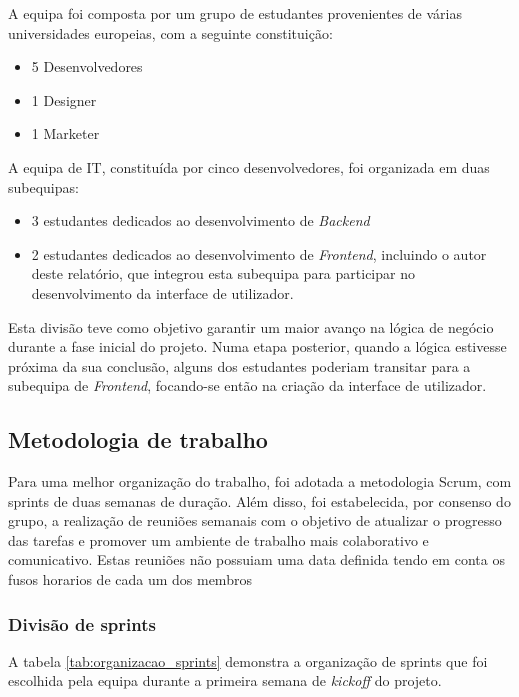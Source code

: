 A equipa foi composta por um grupo de estudantes provenientes de várias universidades europeias, com a seguinte constituição:

\begin{itemize}
    \item 5 Desenvolvedores
    \item 1 Designer
    \item 1 Marketer
\end{itemize}

A equipa de IT, constituída por cinco desenvolvedores, foi organizada em duas subequipas: 
\begin{itemize}
    \item 3 estudantes dedicados ao desenvolvimento de \textit{Backend}
    \item 2 estudantes dedicados ao desenvolvimento de \textit{Frontend}, incluindo o autor deste relatório, que integrou esta subequipa para participar no desenvolvimento da interface de utilizador.
\end{itemize}

Esta divisão teve como objetivo garantir um maior avanço na lógica de negócio durante a fase inicial do projeto. 
Numa etapa posterior, quando a lógica estivesse próxima da sua conclusão, alguns dos estudantes poderiam transitar para a subequipa de \textit{Frontend}, focando-se então na criação da interface de utilizador.

\subsection{Metodologia de trabalho}

Para uma melhor organização do trabalho, foi adotada a metodologia Scrum, com sprints de duas semanas de duração. Além disso, foi estabelecida, por consenso do grupo, a realização de reuniões semanais com o objetivo de atualizar o progresso das tarefas e promover um ambiente de trabalho mais colaborativo e comunicativo. Estas reuniões não possuiam uma data definida tendo em conta os fusos horarios de cada um dos membros

\subsubsection{Divisão de sprints}



A tabela \ref{tab:organizacao_sprints} demonstra a organização de sprints que foi escolhida pela equipa durante a primeira semana de \textit{kickoff} do projeto.


